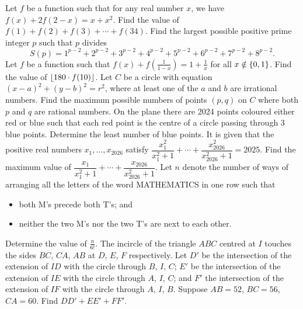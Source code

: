 \begin{enumerate}
    \hyperrefitem[Q::2024-O-1-18] Let $f$ be a function such that for any real number $x$, we have $f(x) + 2f(2-x) = x + x^2$. Find the value of $f(1) + f(2) + f(3) + \cdots + f(34)$.
    \hyperrefitem[Q::2024-O-1-19] Find the largest possible positive prime integer $p$ such that $p$ divides \[S(p) = 1^{p-2} + 2^{p-2} + 3^{p-2} + 4^{p-2} + 5^{p-2} + 6^{p-2} + 7^{p-2} + 8^{p-2}.\]
    \hyperrefitem[Q::2024-O-1-20] Let $f$ be a function such that $f(x) + f(\frac{1}{1-x}) = 1 + \frac1x$ for all $x \notin \left\lbrace 0, 1 \right\rbrace$. Find the value of $\left\lfloor 180 \cdot f(10) \right\rfloor$.
    \hyperrefitem[Q::2024-O-1-21] Let $C$ be a circle with equation $(x-a)^2 + (y-b)^2 = r^2$, where at least one of the $a$ and $b$ are irrational numbers. Find the maximum possible numbers of points $(p,q)$ on $C$ where both $p$ and $q$ are rational numbers.
    \hyperrefitem[Q::2024-O-1-22] On the plane there are 2024 points coloured either red or blue such that each red point is the centre of a circle passing through 3 blue points. Determine the least number of blue points.
    \hyperrefitem[Q::2024-O-1-23] It is given that the positive real numbers $x_1, \ldots, x_{2026}$ satisfy $\dfrac{x_1^2}{x_1^2 + 1} + \cdots + \dfrac{x_{2026}^2}{x_{2026}^2 + 1} = 2025$. Find the maximum value of $\dfrac{x_1}{x_1^2 + 1} + \cdots + \dfrac{x_{2026}}{x_{2026}^2 + 1}$.
    \hyperrefitem[Q::2024-O-1-24] Let $n$ denote the number of ways of arranging all the letters of the word MATHEMATICS in one row such that
    \begin{itemize}
        \item both M's precede both T's; and
        \item neither the two M's nor the two T's are next to each other.
    \end{itemize}
    Determine the value of $\frac{n}{6!}$.
    \hyperrefitem[Q::2024-O-1-25] The incircle of the triangle $ABC$ centred at $I$ touches the sides $BC$, $CA$, $AB$ at $D$, $E$, $F$ respectively. Let $D'$ be the intersection of the extension of $ID$ with the circle through $B$, $I$, $C$; $E'$ be the intersection of the extension of $IE$ with the circle through $A$, $I$, $C$; and $F'$ the intersection of the extension of $IF$ with the circle through $A$, $I$, $B$. Suppose $AB = 52$, $BC = 56$, $CA = 60$. Find $DD' + EE' + FF'$.
 \end{enumerate}
